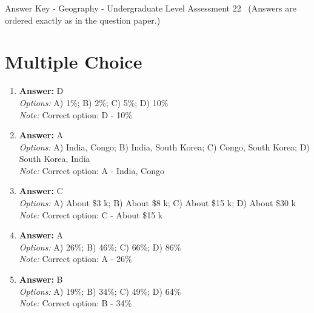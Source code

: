\documentclass[12pt]{article}
\begin{document}
\begin{center}
Answer Key - Geography - Undergraduate Level Assessment 22 \
\small (Answers are ordered exactly as in the question paper.)
\end{center}

\section*{Multiple Choice}
\begin{enumerate}[label=\arabic*.]
\item \textbf{Answer:} D
\\ \textit{Options:} A) 1\%; B) 2\%; C) 5\%; D) 10\%
\\ \textit{Note:} Correct option: D - 10\%
\item \textbf{Answer:} A
\\ \textit{Options:} A) India, Congo; B) India, South Korea; C) Congo, South Korea; D) South Korea, India
\\ \textit{Note:} Correct option: A - India, Congo
\item \textbf{Answer:} C
\\ \textit{Options:} A) About \$3 k; B) About \$8 k; C) About \$15 k; D) About \$30 k
\\ \textit{Note:} Correct option: C - About \$15 k
\item \textbf{Answer:} A
\\ \textit{Options:} A) 26\%; B) 46\%; C) 66\%; D) 86\%
\\ \textit{Note:} Correct option: A - 26\%
\item \textbf{Answer:} B
\\ \textit{Options:} A) 19\%; B) 34\%; C) 49\%; D) 64\%
\\ \textit{Note:} Correct option: B - 34\%
\end{enumerate}
\end{document}
